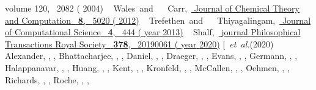 \documentclass[twocolumn,10pt]{revtex4-2}
\begin{document}
\begin{thebibliography}{50}
{{  {volume} {120}},\  {2082} (
  {2004})}%
%
  \BibitemOpen
   { {\ \bibnamefont
  {Wales}}\ and\  {\ \bibnamefont
  {Carr}},\ }\href {https://doi.org/10.1021/ct3004832} {
  { {Journal of Chemical Theory and Computation}\ }\textbf
  { {8}},\  {5020} (
  {2012})}%
%
  \BibitemOpen
   { {\ \bibnamefont
  {Trefethen}}\ and\  {~\bibnamefont
  {Thiyagalingam}},\ }\href {https://doi.org/10.1016/j.jocs.2013.01.005}
  { { {Journal of Computational
  Science}\ }\textbf { {4}},\  {444} (\bibinfo
  {year} {2013})}%
%
  \BibitemOpen
   { {~\bibnamefont
  {Shalf}},\ }\href {https://doi.org/10.1098/rsta.2019.0061} {\bibfield
  {journal} { {Philosophical Transactions Royal Society}\
  }\textbf { {378}},\  {20190061} (\bibinfo
  {year} {2020})}\BibitemShut {NoStop}%
\bibitem [{\ \emph {et~al.}(2020)\citenamefont
  {Alexander}, \citenamefont {Almgren}, \citenamefont {Bell}, \citenamefont
  {Bhattacharjee}, \citenamefont {Chen}, \citenamefont {Colella}, \citenamefont
  {Daniel}, \citenamefont {DeSlippe}, \citenamefont {Diachin}, \citenamefont
  {Draeger}, \citenamefont {Dubey}, \citenamefont {Dunning}, \citenamefont
  {Evans}, \citenamefont {Foster}, \citenamefont {Francois}, \citenamefont
  {Germann}, \citenamefont {Gordon}, \citenamefont {Habib}, \citenamefont
  {Halappanavar}, \citenamefont {Hamilton}, \citenamefont {Hart}, \citenamefont
  {Huang}, \citenamefont {Hungerford}, \citenamefont {Kasen}, \citenamefont
  {Kent}, \citenamefont {Kolev}, \citenamefont {Kothe}, \citenamefont
  {Kronfeld}, \citenamefont {Luo}, \citenamefont {Mackenzie}, \citenamefont
  {McCallen}, \citenamefont {Messer}, \citenamefont {Mniszewski}, \citenamefont
  {Oehmen}, \citenamefont {Perazzo}, \citenamefont {Perez}, \citenamefont
  {Richards}, \citenamefont {Rider}, \citenamefont {Rieben}, \citenamefont
  {Roche}, \citenamefont {Siegel}, \citenamefont {Sprague}, \citenamefont
}
\end{thebibliography}
\end{document}
